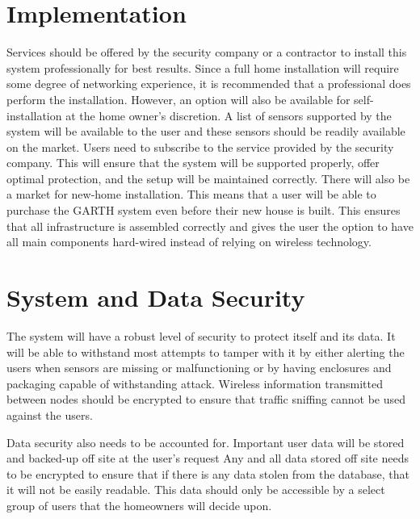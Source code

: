 \documentclass{report}
\begin{document}
\section{Implementation}
Services should be offered by the security company or a contractor to install
this system professionally for best results. Since a full home installation will
require some degree of networking experience, it is recommended that a
professional does perform the installation. However, an option will also be available
for self-installation at the home owner's discretion. A list of sensors
supported by the system will be available to the user and these sensors should be
readily available on the market. Users need to subscribe to the service
provided by the security company. This will ensure that the system will be
supported properly, offer optimal protection, and the setup will be maintained
correctly. There will also be a market for new-home installation. This means that
a user will be able to purchase the GARTH system even before their new house is
built. This ensures that all infrastructure is assembled correctly and gives the user
the option to have all main components hard-wired instead of relying on wireless
technology.

\section{System and Data Security}
The system will have a robust level of security to protect itself and its data. It 
will be able to withstand most attempts to tamper with it by either alerting 
the users when sensors are missing or malfunctioning or by having enclosures and 
packaging capable of withstanding attack. Wireless information transmitted between 
nodes should be encrypted to ensure that traffic sniffing cannot be used against the
users.

Data security also needs to be accounted for. Important user data will be stored
and backed-up off site at the user's request Any and all data stored off site
needs to be encrypted to ensure that if there is any data stolen from the
database, that it will not be easily readable. This data should only be
accessible by a select group of users that the homeowners will decide upon.

\end{document}
